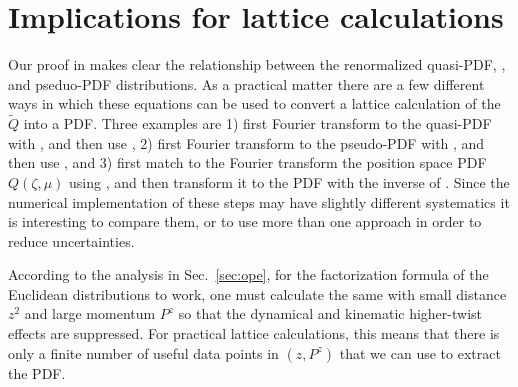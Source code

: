 \section{Implications for lattice calculations}
\label{sec:lattice}

Our proof in  makes clear the relationship between the renormalized quasi-PDF, \spcorr, and pseduo-PDF distributions.  As a practical matter there are a few different ways in which these equations can be used to convert a lattice calculation of the \spcorr $\tilde Q$ into a PDF. Three examples are 1) first Fourier transform to the quasi-PDF with , and then use , 2) first Fourier transform to the pseudo-PDF with , and then use , and 3) first match to the Fourier transform the position space PDF $Q(\zeta,\mu)$ using , and then transform it to the PDF with the inverse of .  Since the numerical implementation of these steps may have slightly different systematics it is interesting to compare them, or to use more than one approach in order to reduce uncertainties.

According to the analysis in Sec.~\ref{sec:ope}, for the factorization formula of the Euclidean distributions to work, one must calculate the same \spcorr with small distance $z^2$ and large momentum $P^z$ so that the dynamical and kinematic higher-twist effects are suppressed. For practical lattice calculations, this means that there is only a finite number of useful data points in $(z, P^z)$ that we can use to extract the PDF.

